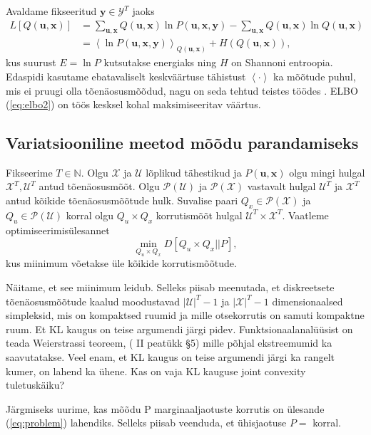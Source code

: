 Avaldame fikseeritud $\bm{y} \in \mathcal{Y}^T$ jaoks
\begin{align}
    \label{eq:elbo1}
    L[Q(\bm{u}, \bm{x})] &=\sum_{\bm{u}, \bm{x}} Q(\bm{u}, \bm{x}) \ln P(\bm{u}, \bm{x}, \bm{y}) - \sum_{\bm{u}, \bm{x}} Q(\bm{u}, \bm{x}) \ln Q(\bm{u}, \bm{x})\\
    \label{eq:elbo2}
    &= \left< \ln P(\bm{u}, \bm{x},\bm{y}) \right>_{Q(\bm{u}, \bm{x})} + H(Q(\bm{u}, \bm{x})),
\end{align}
kus suurust $E = \ln P$ kutsutakse energiaks ning $H$ on Shannoni entroopia. Edaspidi kasutame ebatavaliselt keskväärtuse tähistust $\left<  \cdot \right>$ ka mõõtude puhul, mis ei pruugi olla tõenäosusmõõdud, nagu on seda tehtud teistes töödes \parencite{Parr.2019}. ELBO (\ref{eq:elbo2}) on töös kesksel kohal maksimiseeritav väärtus.

\subsection{Variatsiooniline meetod mõõdu parandamiseks}

Fikseerime $T \in \mathbb{N}$. Olgu $\mathcal{X}$ ja $\mathcal{U}$ lõplikud tähestikud ja $P(\bm{u},\bm{x})$ olgu mingi hulgal $\mathcal{X}^T,\mathcal{U}^T$ antud tõenäosusmõõt. Olgu $\mathcal{P}(\mathcal{U})$ ja $\mathcal{P}(\mathcal{X})$ vastavalt hulgal $\mathcal{U}^T$ ja $\mathcal{X}^T$ antud kõikide tõenäosusmõõtude hulk. Suvalise paari $Q_x \in \mathcal{P}(\mathcal{X})$ ja $Q_u \in \mathcal{P}(\mathcal{U})$ korral olgu $Q_u \times Q_x$ korrutismõõt hulgal $\mathcal{U}^T \times \mathcal{X}^T$. Vaatleme optimiseerimisülesannet
\begin{equation}
    \label{eq:problem}
    \min_{Q_u \times Q_x} D[Q_u \times Q_x || P],
\end{equation}
kus miinimum võetakse üle kõikide korrutismõõtude.

Näitame, et see miinimum leidub. Selleks piisab meenutada, et diskreetsete tõenäosusmõõtude kaalud moodustavad $|\mathcal{U}|^T-1$ ja $|\mathcal{X}|^T -1$ dimensionaalsed simpleksid, mis on kompaktsed ruumid ja mille otsekorrutis on samuti kompaktne ruum. Et KL kaugus on teise argumendi järgi pidev. Funktsionaalanalüüsist on teada Weierstrassi teoreem, (\cite{Oja.1991}{ II peatükk §5}) mille põhjal ekstreemumid ka saavutatakse. Veel enam, et KL kaugus on teise argumendi järgi ka rangelt kumer, on lahend ka ühene. Kas on vaja KL kauguse joint convexity tuletuskäiku? \bla

Järgmiseks uurime, kas mõõdu P marginaaljaotuste korrutis on ülesande (\ref{eq:problem}) lahendiks. Selleks piisab veenduda, et ühisjaotuse $ P = $ \bla korral.

